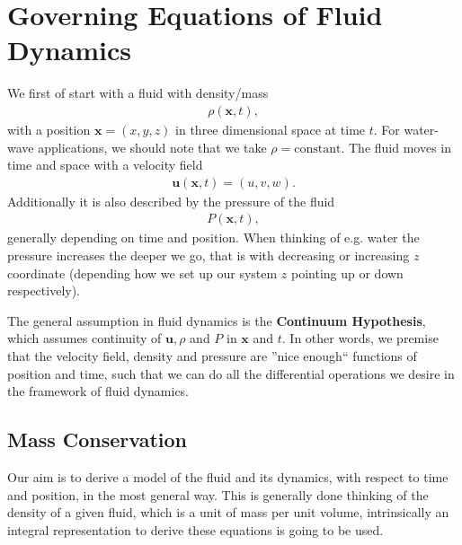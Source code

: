 



\maketitle
\tableofcontents

\section{Governing Equations of Fluid Dynamics}
We first of start with a fluid with density/mass
\begin{align}
    \rho(\mathbf{x}, t),
\end{align}
with a position $\mathbf{x} = (x, y, z)$ in three dimensional space at time
$t$. For water-wave applications, we should note that we take
$\rho=\text{constant}$. The fluid moves in time and space with a velocity field
\begin{align}
    \mathbf{u}(\mathbf{x}, t) = (u, v, w).
\end{align}
Additionally it is also described by the pressure of the fluid
\begin{align}
    P(\mathbf{x}, t),
\end{align}
generally depending on time and position. When thinking of e.g. water the
pressure increases the deeper we go, that is with decreasing or increasing $z$
coordinate (depending how we set up our system $z$ pointing up or down
respectively).

The general assumption in fluid dynamics is the \textbf{Continuum
Hypothesis}, which assumes continuity of $\textbf{u}, \rho$ and $P$ in
$\mathbf{x}$ and $t$. In other words, we premise that the velocity field,
density and pressure are ''nice enough`` functions of position and time, such
that we can do all the differential operations we desire in the framework of
fluid dynamics.
\subsection{Mass Conservation}
Our aim is to derive a model of the fluid and its dynamics, with respect to
time and position, in the most general way. This is generally done thinking
of the density of a given fluid, which is a unit of mass per unit volume,
intrinsically  an integral representation to derive these equations is going
to be used.

